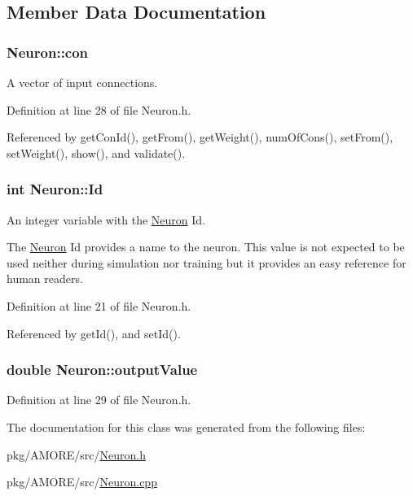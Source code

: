 \subsection{Member Data Documentation}
\hypertarget{class_neuron_a1451f2424a8f9e46ca643d03ff98a616}{
\subsubsection[{con}]{ {\bf Neuron::con}}}
\label{class_neuron_a1451f2424a8f9e46ca643d03ff98a616}


A vector of input connections. 



Definition at line 28 of file Neuron.h.



Referenced by getConId(), getFrom(), getWeight(), numOfCons(), setFrom(), setWeight(), show(), and validate().

\hypertarget{class_neuron_a72bb327a7c5c865e6748a4e074ce0680}{
\subsubsection[{Id}]{\setlength{\rightskip}{0pt plus 5cm}int {\bf Neuron::Id}}}
\label{class_neuron_a72bb327a7c5c865e6748a4e074ce0680}


An integer variable with the \hyperlink{class_neuron}{Neuron} Id. 

The \hyperlink{class_neuron}{Neuron} Id provides a name to the neuron. This value is not expected to be used neither during simulation nor training but it provides an easy reference for human readers. 

Definition at line 21 of file Neuron.h.



Referenced by getId(), and setId().

\hypertarget{class_neuron_ada029047646c36e525a6a1b77cafc03c}{
\subsubsection[{outputValue}]{\setlength{\rightskip}{0pt plus 5cm}double {\bf Neuron::outputValue}}}
\label{class_neuron_ada029047646c36e525a6a1b77cafc03c}


Definition at line 29 of file Neuron.h.



The documentation for this class was generated from the following files:\begin{DoxyCompactItemize}
\item 
pkg/AMORE/src/\hyperlink{_neuron_8h}{Neuron.h}\item 
pkg/AMORE/src/\hyperlink{_neuron_8cpp}{Neuron.cpp}\end{DoxyCompactItemize}
